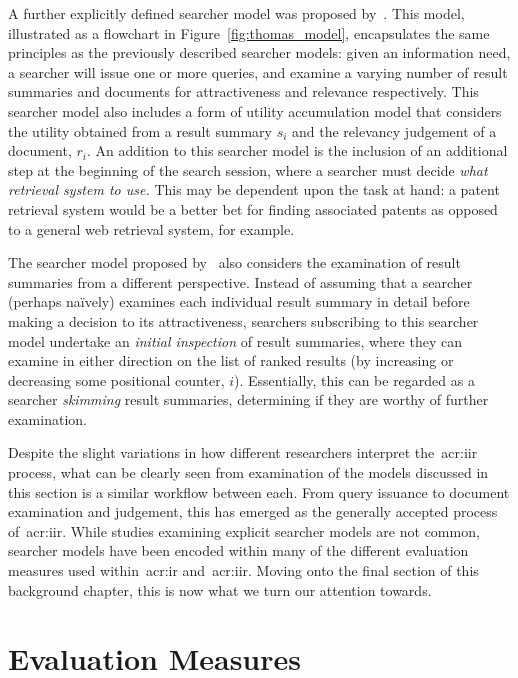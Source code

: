 A further explicitly defined searcher model was proposed by~\cite{thomas2014modelling_behaviour}. This model, illustrated as a flowchart in Figure~\ref{fig:thomas_model}, encapsulates the same principles as the previously described searcher models: given an information need, a searcher will issue one or more queries, and examine a varying number of result summaries and documents for attractiveness and relevance respectively. This searcher model also includes a form of utility accumulation model that considers the utility obtained from a result summary $s_i$ and the relevancy judgement of a document, $r_i$. An addition to this searcher model is the inclusion of an additional step at the beginning of the search session, where a searcher must decide \emph{what retrieval system to use.} This may be dependent upon the task at hand: a patent retrieval system would be a better bet for finding associated patents as opposed to a general web retrieval system, for example.

The searcher model proposed by~\cite{thomas2014modelling_behaviour} also considers the examination of result summaries from a different perspective. Instead of assuming that a searcher (perhaps na\"{i}vely) examines each individual result summary in detail before making a decision to its attractiveness, searchers subscribing to this searcher model undertake an \emph{initial inspection} of result summaries, where they can examine in either direction on the list of ranked results (by increasing or decreasing some positional counter, $i$). Essentially, this can be regarded as a searcher \emph{skimming} result summaries, determining if they are worthy of further examination.

Despite the slight variations in how different researchers interpret the~\gls{acr:iir} process, what can be clearly seen from examination of the models discussed in this section is a similar workflow between each. From query issuance to document examination and judgement, this has emerged as the generally accepted process of~\gls{acr:iir}. While studies examining explicit searcher models are not common, searcher models have been encoded within many of the different evaluation measures used within~\gls{acr:ir} and~\gls{acr:iir}. Moving onto the final section of this background chapter, this is now what we turn our attention towards.

\section{Evaluation Measures}\label{sec:ir_background:evaluation}


